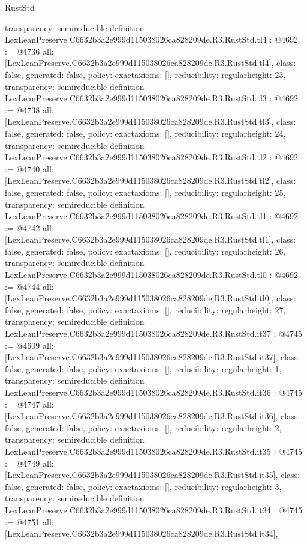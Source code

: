 \begin{lexlean}{RustStd}
\begin{coremodule}
{  transparency: semireducible
}
definition LexLeanPreserve.C6632b3a2e999d115038026ca828209de.R3.RustStd.tl4 : @4692 := @4736 {
  all: [LexLeanPreserve.C6632b3a2e999d115038026ca828209de.R3.RustStd.tl4],
  class: false,
  generated: false,
  policy: exact{axioms: []},
  reducibility: regular{height: 23},
  transparency: semireducible
}
definition LexLeanPreserve.C6632b3a2e999d115038026ca828209de.R3.RustStd.tl3 : @4692 := @4738 {
  all: [LexLeanPreserve.C6632b3a2e999d115038026ca828209de.R3.RustStd.tl3],
  class: false,
  generated: false,
  policy: exact{axioms: []},
  reducibility: regular{height: 24},
  transparency: semireducible
}
definition LexLeanPreserve.C6632b3a2e999d115038026ca828209de.R3.RustStd.tl2 : @4692 := @4740 {
  all: [LexLeanPreserve.C6632b3a2e999d115038026ca828209de.R3.RustStd.tl2],
  class: false,
  generated: false,
  policy: exact{axioms: []},
  reducibility: regular{height: 25},
  transparency: semireducible
}
definition LexLeanPreserve.C6632b3a2e999d115038026ca828209de.R3.RustStd.tl1 : @4692 := @4742 {
  all: [LexLeanPreserve.C6632b3a2e999d115038026ca828209de.R3.RustStd.tl1],
  class: false,
  generated: false,
  policy: exact{axioms: []},
  reducibility: regular{height: 26},
  transparency: semireducible
}
definition LexLeanPreserve.C6632b3a2e999d115038026ca828209de.R3.RustStd.tl0 : @4692 := @4744 {
  all: [LexLeanPreserve.C6632b3a2e999d115038026ca828209de.R3.RustStd.tl0],
  class: false,
  generated: false,
  policy: exact{axioms: []},
  reducibility: regular{height: 27},
  transparency: semireducible
}
definition LexLeanPreserve.C6632b3a2e999d115038026ca828209de.R3.RustStd.it37 : @4745 := @4609 {
  all: [LexLeanPreserve.C6632b3a2e999d115038026ca828209de.R3.RustStd.it37],
  class: false,
  generated: false,
  policy: exact{axioms: []},
  reducibility: regular{height: 1},
  transparency: semireducible
}
definition LexLeanPreserve.C6632b3a2e999d115038026ca828209de.R3.RustStd.it36 : @4745 := @4747 {
  all: [LexLeanPreserve.C6632b3a2e999d115038026ca828209de.R3.RustStd.it36],
  class: false,
  generated: false,
  policy: exact{axioms: []},
  reducibility: regular{height: 2},
  transparency: semireducible
}
definition LexLeanPreserve.C6632b3a2e999d115038026ca828209de.R3.RustStd.it35 : @4745 := @4749 {
  all: [LexLeanPreserve.C6632b3a2e999d115038026ca828209de.R3.RustStd.it35],
  class: false,
  generated: false,
  policy: exact{axioms: []},
  reducibility: regular{height: 3},
  transparency: semireducible
}
definition LexLeanPreserve.C6632b3a2e999d115038026ca828209de.R3.RustStd.it34 : @4745 := @4751 {
  all: [LexLeanPreserve.C6632b3a2e999d115038026ca828209de.R3.RustStd.it34],
}
\end{coremodule}
\end{lexlean}
